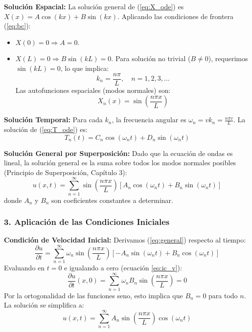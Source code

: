 \documentclass[a4paper]{article}
\begin{document}
\textbf{Solución Espacial:}
La solución general de (\ref{eq:X_ode}) es $X(x) = A \cos(kx) + B \sin(kx)$. Aplicando las condiciones de frontera (\ref{eq:bc}):
\begin{itemize}
    \item $X(0) = 0 \Rightarrow A = 0$.
    \item $X(L) = 0 \Rightarrow B \sin(kL) = 0$. Para solución no trivial ($B \neq 0$), requerimos $\sin(kL) = 0$, lo que implica:
    \begin{equation}
    k_n = \frac{n\pi}{L}, \quad n = 1, 2, 3, \dots
    \end{equation}
    Las autofunciones espaciales (modos normales) son:
    \begin{equation}
    X_n(x) = \sin\left(\frac{n\pi x}{L}\right)
    \end{equation}
\end{itemize}

\textbf{Solución Temporal:}
Para cada $k_n$, la frecuencia angular es $\omega_n = v k_n = \frac{n\pi v}{L}$. La solución de (\ref{eq:T_ode}) es:
\begin{equation}
T_n(t) = C_n \cos(\omega_n t) + D_n \sin(\omega_n t)
\end{equation}

\textbf{Solución General por Superposición:}
Dado que la ecuación de ondas es lineal, la solución general es la suma sobre todos los modos normales posibles (Principio de Superposición, Capítulo 3):
\begin{equation}
u(x, t) = \sum_{n=1}^{\infty} \sin\left(\frac{n\pi x}{L}\right) \left[ A_n \cos(\omega_n t) + B_n \sin(\omega_n t) \right]
\label{eq:general}
\end{equation}
donde $A_n$ y $B_n$ son coeficientes constantes a determinar.

\subsubsection{3. Aplicación de las Condiciones Iniciales}

\textbf{Condición de Velocidad Inicial:}
Derivamos (\ref{eq:general}) respecto al tiempo:
\begin{equation}
\frac{\partial u}{\partial t} = \sum_{n=1}^{\infty} \omega_n \sin\left(\frac{n\pi x}{L}\right) \left[ -A_n \sin(\omega_n t) + B_n \cos(\omega_n t) \right]
\end{equation}
Evaluando en $t=0$ e igualando a cero (ecuación \ref{eq:ic_v}):
\begin{equation}
\frac{\partial u}{\partial t}(x, 0) = \sum_{n=1}^{\infty} \omega_n B_n \sin\left(\frac{n\pi x}{L}\right) = 0
\end{equation}
Por la ortogonalidad de las funciones seno, esto implica que $B_n = 0$ para todo $n$. La solución se simplifica a:
\begin{equation}
u(x, t) = \sum_{n=1}^{\infty} A_n \sin\left(\frac{n\pi x}{L}\right) \cos(\omega_n t)
\end{equation}
\end{document}
